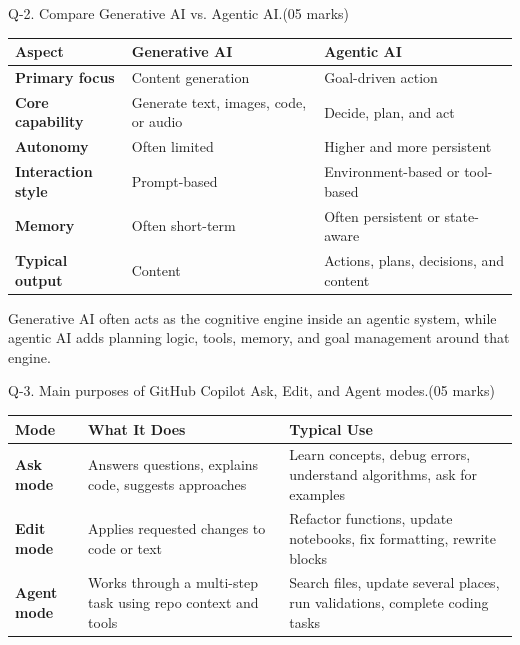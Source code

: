 \documentclass[11pt,a4paper]{article}
\newcommand{\question}[2]{%
  \begin{qbox}#1\hfill\textcolor{accent}{(05 marks)}\\[2pt]#2\end{qbox}%
}
\begin{document}
\question{Q-2. Compare Generative AI vs. Agentic AI.}{}

\begin{center}
\begin{tabular}{@{}>{\bfseries}p{3.0cm}p{5.2cm}p{5.2cm}@{}}
\toprule
\rowcolor{primary!15}
\textbf{Aspect} & \textbf{Generative AI} & \textbf{Agentic AI} \\
\midrule
Primary focus & Content generation & Goal-driven action \\
Core capability & Generate text, images, code, or audio & Decide, plan, and act \\
Autonomy & Often limited & Higher and more persistent \\
Interaction style & Prompt-based & Environment-based or tool-based \\
Memory & Often short-term & Often persistent or state-aware \\
Typical output & Content & Actions, plans, decisions, and content \\
\bottomrule
\end{tabular}
\end{center}

\begin{conceptbox}
Generative AI often acts as the cognitive engine inside an agentic system, while agentic AI adds planning logic, tools, memory, and goal management around that engine.
\end{conceptbox}

\question{Q-3. Main purposes of GitHub Copilot Ask, Edit, and Agent modes.}{}

\begin{center}
\begin{tabular}{@{}>{\bfseries}p{2.4cm}p{4.6cm}p{6.4cm}@{}}
\toprule
\rowcolor{primary!15}
\textbf{Mode} & \textbf{What It Does} & \textbf{Typical Use} \\
\midrule
Ask mode & Answers questions, explains code, suggests approaches & Learn concepts, debug errors, understand algorithms, ask for examples \\
Edit mode & Applies requested changes to code or text & Refactor functions, update notebooks, fix formatting, rewrite blocks \\
Agent mode & Works through a multi-step task using repo context and tools & Search files, update several places, run validations, complete coding tasks \\
\bottomrule
\end{tabular}
\end{center}
\end{document}
